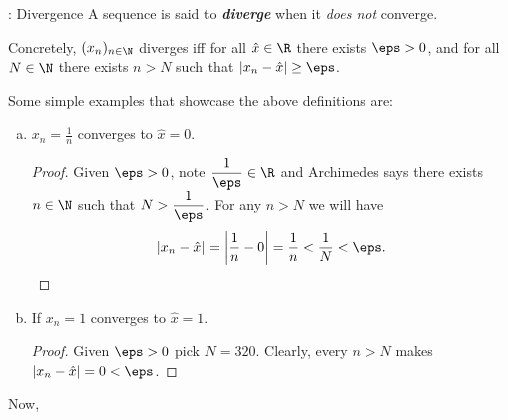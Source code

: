 \begin{ndef}{: Divergence}
	A sequence is said to \emph{\textbf{diverge}} when it \textit{does not} converge.
	
	\medskip
	
	Concretely, \((x_n)_{n\in\N}\) diverges iff for all \(\hat{x}\in\R\) there exists \(\eps>0\), and for all \(N\in\N\) there exists \(n>N\) such that \(|x_n-\hat{x}|\geq \eps\).
\end{ndef}
\begin{example}
	Some simple examples that showcase the above definitions are:
	\begin{enumerate}[(a)]
		\item \(x_n=\displaystyle\frac{1}{n}\) converges to \(\hat{x}=0\). 
		\begin{proof}
			Given \(\eps>0\), note \(\displaystyle\frac{1}{\eps}\in\R\) and Archimedes says there exists \(n\in\N\) such that \(N>\displaystyle\frac{1}{\eps}\). For any \(n>N\) we will have 
			\begin{equation*}
				|x_n-\hat{x}|=\left|\frac{1}{n}-0\right|=\frac{1}{n}<\frac{1}{N}<\eps.
			\end{equation*}
		\end{proof}
		
		\item If \(x_n=1\) converges to \(\hat{x}=1\).
		\begin{proof}
			Given \(\eps>0\) pick \(N=320\). Clearly, every \(n>N\) makes \(|x_n-\hat{x}|=0<\eps\).
		\end{proof}
	\end{enumerate}
\end{example}
Now, 
